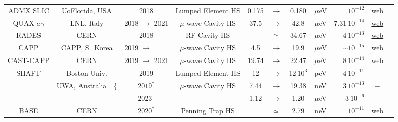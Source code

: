 \begin{table}[!p]
\begin{center}
{\begin{tabular}{ccccccclrcc}
        \rule{0pt}{1ex} 
        {\sc ADMX SLIC} & UoFlorida, USA & 2018 & Lumped Element HS & 0.175 &$\to$ & 0.180 &$\mu$eV & $10^{-12}$ & \href{https://depts.washington.edu/admx/}{web} & \cite{ADMX}
        \\
        
        \rule{0pt}{1ex}
        {\sc QUAX-$a\gamma$} & LNL, Italy & 2018 $\to$ 2021 & $\mu$-wave Cavity HS &37.5 & $\to$ &42.8 &$\mu$eV & $7.31\ 10^{-14}$ & \href{https://www.pd.infn.it/eng/quax/}{web} & \cite{QUAX}
        \\

        \rule{0pt}{1ex}
        {\sc RADES} & CERN & 2018 & RF Cavity HS & & $\simeq$ & 34.67 & $\mu$eV &$4\ 10^{-13}$ & \href{https://www.mpp.mpg.de/en/research/rades-detector}{web} & \cite{RADES}
        \\

        \rule{0pt}{1ex} 
        {\sc CAPP} & {CAPP, S.~Korea} & 2019 $\to$ ~~~~ & $\mu$-wave Cavity HS & 4.5 &$\to$ &19.9 &$\mu$eV & $ \sim 10^{-15} $ & \href{https://capp.ibs.re.kr/html/capp_en/}{web}  & \cite{CAPP}
        \\

        \rule{0pt}{1ex} 
        {\sc CAST-CAPP} & CERN & 2019 $\to$ 2021 & $\mu$-wave Cavity HS & 19.74 &$\to$ &22.47 &$\mu$eV & $8\ 10^{-14}$ & \href{http://cast.web.cern.ch/CAST/index.php}{web}  & \cite{CAST-CAPP}
        \\

        \rule{0pt}{1ex}
        {\sc SHAFT} & Boston Univ. & 2019 & Lumped Element HS & 12 &$\to$ &12$\ 10^3$ & peV & $4\ 10^{-11}$ & $-$ &\cite{SHAFT}
        \\

        \rule{0pt}{1ex}
        \multirow{2}{*}{\sc UPLOAD} & \multirow{2}{*}{UWA, Australia~~$\Big\{$} & $2019^{\dagger}$ &\multirow{2}{*}{$\mu$-wave Cavity HS} & 7.44 &$\to$ &19.38 &neV & $3\ 10^{-13}$ & \multirow{2}{*}{$-$} &\multirow{2}{*}{\cite{UPLOAD}}
        \\
        & & $2023^{\dagger}$ & & 1.12 &$\to$ & 1.20 &$\mu$eV & $3\ 10^{-6}$ & & 
        \\

        \rule{0pt}{1ex} 
        {\sc BASE} & CERN & $2020^{\dagger}$ & Penning Trap HS & &$\simeq$ &2.79 &neV & $10^{-11}$ & \href{https://base.web.cern.ch/content/base-experiment}{web}  &\cite{BASE}
        \\


\end{tabular}}
\end{center}
\end{table}
